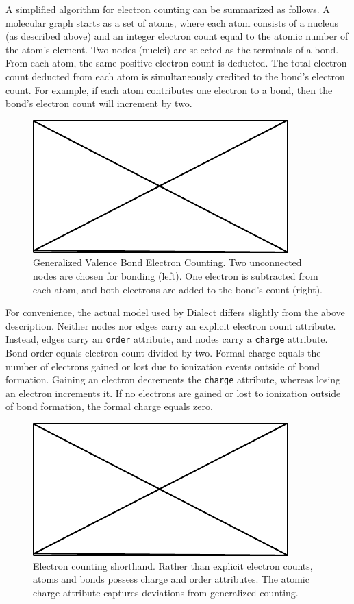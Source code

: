 \documentclass{article}
\def\ttt{\texttt}
\begin{document}
A simplified algorithm for electron counting can be summarized as follows. A molecular graph starts as a set of atoms, where each atom consists of a nucleus (as described above) and an integer electron count equal to the atomic number of the atom's element. Two nodes (nuclei) are selected as the terminals of a bond. From each atom, the same positive electron count is deducted. The total electron count deducted from each atom is simultaneously credited to the bond's electron count. For example, if each atom contributes one electron to a bond, then the bond's electron count will increment by two.

\begin{figure}
    \centering
    \includegraphics{filler}
    \caption{Generalized Valence Bond Electron Counting. Two unconnected nodes are chosen for bonding (left). One electron is subtracted from each atom, and both electrons are added to the bond's count (right).}
    \label{fig:electron-counting}
\end{figure}

For convenience, the actual model used by Dialect differs slightly from the above description. Neither nodes nor edges carry an explicit electron count attribute. Instead, edges carry an \ttt{order} attribute, and nodes carry a \ttt{charge} attribute. Bond order equals electron count divided by two. Formal charge equals the number of electrons gained or lost due to ionization events outside of bond formation. Gaining an electron decrements the \ttt{charge} attribute, whereas losing an electron increments it. If no electrons are gained or lost to ionization outside of bond formation, the formal charge equals zero. 

\begin{figure}
    \centering
    \includegraphics{filler}
    \caption{Electron counting shorthand. Rather than explicit electron counts, atoms and bonds possess charge and order attributes. The atomic charge attribute captures deviations from generalized counting.}
    \label{fig:electron-counting-shorthand}
\end{figure}
\end{document}
